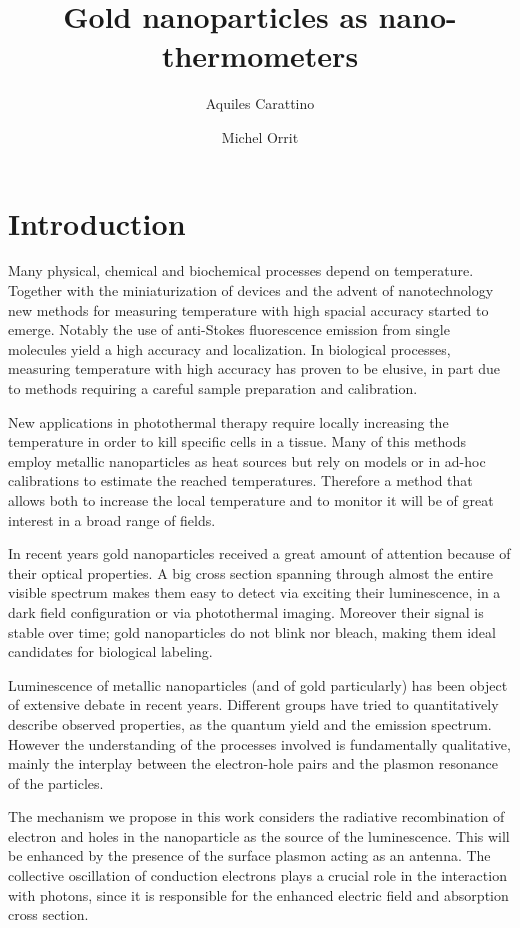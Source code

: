 \documentclass[journal=nalefd,manuscript=letter]{achemso}
\author{Aquiles Carattino}
\affiliation[Leiden]
{Huygens-Kamerlingh Onnes Lab, 2300RA Leiden, The Netherlands}
\author{Michel Orrit}
\affiliation[Leiden]
{Huygens-Kamerlingh Onnes Lab, 2300RA Leiden, The Netherlands}
\title{Gold nanoparticles as nano-thermometers}
\begin{document}
\maketitle
{}
\section{Introduction}
Many physical, chemical and biochemical processes depend on temperature.
Together with the miniaturization of devices and the advent of nanotechnology
new methods for measuring temperature with high spacial accuracy started to
emerge. Notably the use of anti-Stokes fluorescence emission from single
molecules yield a high accuracy and localization. In biological processes,
measuring temperature with high accuracy has proven to be elusive, in part due
to methods requiring a careful sample preparation and calibration. 

New applications in photothermal therapy require locally increasing the
temperature in order to kill specific cells in a tissue. Many of this methods
employ metallic nanoparticles as heat sources but rely on models or in ad-hoc
calibrations to estimate the reached temperatures. Therefore a method that
allows both to increase the local temperature and to monitor it will be of great
interest in a broad range of fields. 

In recent years gold nanoparticles received a great amount of attention because
of their optical properties. A big cross section spanning through almost the entire
visible spectrum makes them easy to detect via exciting their luminescence, in
a dark field configuration or via photothermal imaging. Moreover their signal is
stable over time; gold nanoparticles do not blink nor bleach, making them ideal
candidates for biological labeling. 

Luminescence of metallic nanoparticles (and of gold particularly) has been
object of extensive debate in recent years. Different groups have tried to
quantitatively describe observed properties, as the quantum yield and the
emission spectrum. However the understanding of the processes involved is
fundamentally qualitative, mainly the interplay between the electron-hole pairs
and the plasmon resonance of the particles. 

The mechanism we propose in this work considers the radiative recombination of
electron and holes in the nanoparticle as the source of the luminescence. This
will be enhanced by the presence of the surface plasmon acting as an antenna.
The collective oscillation of conduction electrons plays a crucial role in the
interaction with photons, since it is responsible for the enhanced electric
field and absorption cross section. 
\end{document}
